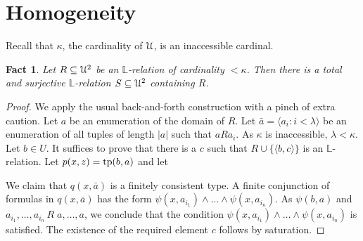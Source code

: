 \documentclass[12pt,letterpaper,oneside,reqno]{amsart}
\theoremstyle{plain}
\newtheorem{proposition}[theorem]{Proposition}
\newtheorem{fact}[theorem]{Fact}
\theoremstyle{remark}
\begin{document}





\section{Homogeneity}
Recall that $\kappa$,  the cardinality of ${\EuScript U}$, is an inaccessible cardinal.

\begin{fact}
  Let $R\subseteq{\EuScript U}^2$ be an $\mathds{L}$-relation of cardinality $<\kappa$.
  Then there is a total and surjective $\mathds{L}$-relation $S\subseteq{\EuScript U}^2$ containing $R$.
\end{fact}

\begin{proof}
  We apply the usual back-and-forth construction with a pinch of extra caution.
  Let $a$ be an enumeration of the domain of $R$.
  Let $\bar a=\langle a_i:i<\lambda\rangle$ be an enumeration of all tuples of length $|a|$ such that $aRa_i$.
  As $\kappa$ is inaccessible, $\lambda<\kappa$.
  Let $b\in U$.
  It suffices to prove that there is a $c$ such that $R\cup\{\langle b,c\rangle\}$ is an $\mathds{L}$-relation.
  Let $p(x,z)={\rm tp}(b,a)$ and let
  

  We claim that $q(x,\bar a)$ is a finitely consistent type.
  A finite conjunction of formulas in $q(x,\bar a)$ has the form $\psi(x,a_{i_1})\wedge\dots\wedge\psi(x,a_{i_n})$.
  As $\psi(b,a)$ and $a_{i_1},\dots,a_{i_n}\,R\;a,\dots,a$, we conclude that the condition $\psi(x,a_{i_1})\wedge\dots\wedge\psi(x,a_{i_n})$ is satisfied.
  The existence of the required element $c$ follows by saturation.
\end{proof}
\end{document}
